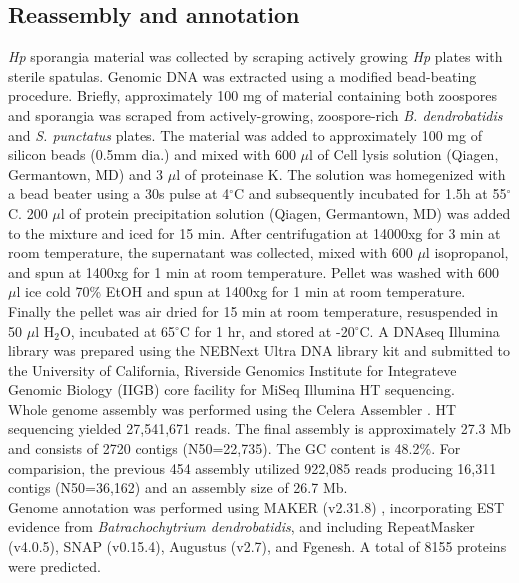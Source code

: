 \subsection*{Reassembly and annotation}
\textit{Hp} sporangia material was collected by scraping actively growing \textit{Hp} plates with sterile spatulas. Genomic DNA was extracted using a modified bead-beating procedure. Briefly, approximately 100 mg of material containing both zoospores and sporangia was scraped from actively-growing, zoospore-rich \textit{B. dendrobatidis} and \textit{S. punctatus} plates. The material was added to approximately 100 mg of silicon beads (0.5mm dia.) and mixed with 600 $\mu$l of Cell lysis solution (Qiagen, Germantown, MD) and 3 $\mu$l of proteinase K. The solution was homegenized with a bead beater using a 30s pulse at 4$^{\circ}$C and subsequently incubated for 1.5h at 55$^{\circ}$C. 200 $\mu$l of protein precipitation solution (Qiagen, Germantown, MD) was added to the mixture and iced for 15 min. After centrifugation at 14000xg for 3 min at room temperature, the supernatant was collected, mixed with 600 $\mu$l isopropanol, and spun at 1400xg for 1 min at room temperature. Pellet was washed with 600 $\mu$l ice cold 70\% EtOH and spun at 1400xg for 1 min at room temperature. Finally the pellet was air dried for 15 min at room temperature, resuspended in 50 $\mu$l H$_{2}$O, incubated at 65$^{\circ}$C for 1 hr, and stored at -20$^{\circ}$C. A DNAseq Illumina library was prepared using the NEBNext Ultra DNA library kit and submitted to the University of California, Riverside Genomics Institute for Integrateve Genomic Biology (IIGB) core facility for MiSeq Illumina HT sequencing.\\
\indent Whole genome assembly was performed using the Celera Assembler \cite{Myers2000}. HT sequencing yielded 27,541,671 reads. The final assembly is approximately 27.3 Mb and consists of 2720 contigs (N50=22,735). The GC content is 48.2\%. For comparision, the previous 454 assembly utilized 922,085 reads producing 16,311 contigs (N50=36,162) and an assembly size of 26.7 Mb.\\
\indent Genome annotation was performed using MAKER (v2.31.8) \cite{Cantarel2008}, incorporating EST evidence from \textit{Batrachochytrium dendrobatidis}, and including RepeatMasker (v4.0.5), SNAP (v0.15.4), Augustus (v2.7), and Fgenesh. A total of 8155 proteins were predicted.\\

